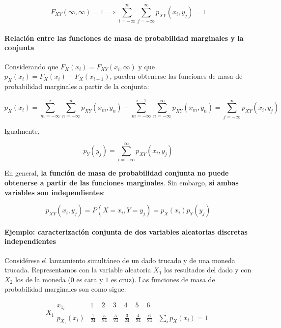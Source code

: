 \documentclass[11pt]{article}
\begin{document}
\[F_{XY}(\infty, \infty) = 1 \implies \sum_{i=-\infty}^\infty\sum_{j=-\infty}^\infty p_{XY}(x_i, y_j) = 1\]

    \hypertarget{relaciuxf3n-entre-las-funciones-de-masa-de-probabilidad-marginales-y-la-conjunta}{%
\paragraph{Relación entre las funciones de masa de probabilidad
marginales y la
conjunta}\label{relaciuxf3n-entre-las-funciones-de-masa-de-probabilidad-marginales-y-la-conjunta}}

Considerando que \(F_X(x_i)=F_{XY}(x_i,\infty)\) y que
\(p_X(x_i) = F_X(x_i)-F_X(x_{i-1})\), pueden obtenerse las funciones de
masa de probabilidad marginales a partir de la conjunta:

\[p_X(x_i) = \sum_{m=-\infty}^i\sum_{n=-\infty}^\infty p_{XY}(x_m, y_n) - \sum_{m=-\infty}^{i-1}\sum_{n=-\infty}^\infty p_{XY}(x_m, y_n) = \sum_{j=-\infty}^\infty p_{XY}(x_i, y_j)\]

Igualmente,

\[p_Y(y_j) = \sum_{i=-\infty}^\infty p_{XY}(x_i, y_j)\]

En general, \textbf{la función de masa de probabilidad conjunta no puede
obtenerse a partir de las funciones marginales}. Sin embargo, \textbf{si
ambas variables son independientes}:

\[p_{XY}(x_i, y_j) = P(X=x_i, Y=y_j) = p_X(x_i)p_Y(y_j) \]

    \hypertarget{ejemplo-caracterizaciuxf3n-conjunta-de-dos-variables-aleatorias-discretas-independientes}{%
\paragraph{Ejemplo: caracterización conjunta de dos variables aleatorias
discretas
independientes}\label{ejemplo-caracterizaciuxf3n-conjunta-de-dos-variables-aleatorias-discretas-independientes}}

Considérese el lanzamiento simultáneo de un dado trucado y de una moneda
trucada. Representamos con la variable aleatoria \(X_1\) los resultados
del dado y con \(X_2\) los de la moneda (\(0\) es cara y \(1\) es cruz).
Las funciones de masa de probabilidad marginales son como sigue:

\[
X_1 \begin{array}{c|cccccc|c}
  x_{1_i} & 1 & 2 & 3 & 4 & 5 & 6 &  \\ 
  \hline
    p_{X_1}(x_i) & \frac{1}{24} & \frac{5}{24} & \frac{5}{24} & \frac{3}{24} & \frac{4}{24} & \frac{6}{24} & \sum_i p_X(x_i)=1
 \end{array}
\]
\end{document}
